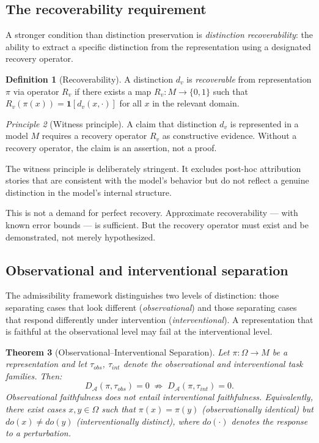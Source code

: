 \documentclass[11pt, a4paper]{article}
\theoremstyle{plain}
\newtheorem{theorem}{Theorem}[section]
\theoremstyle{definition}
\newtheorem{definition}[theorem]{Definition}
\theoremstyle{remark}
\newtheorem{principle}[theorem]{Principle}
\newcommand{\Proj}{\pi}
\newcommand{\dA}{D_{\!\mathcal{A}}}
\begin{document}
\subsection{The recoverability requirement}

A stronger condition than distinction preservation is
\emph{distinction recoverability}: the ability to extract
a specific distinction from the representation using a
designated recovery operator.

\begin{definition}[Recoverability]
\label{def:recover}
A distinction $d_v$ is \emph{recoverable} from representation $\Proj$
via operator $R_v$ if there exists a map $R_v : M \to \{0,1\}$ such that
$R_v(\Proj(x)) = \mathbf{1}[d_v(x,\cdot)]$ for all $x$ in the relevant domain.
\end{definition}

\begin{principle}[Witness principle]
\label{prin:witness}
A claim that distinction $d_v$ is represented in a model $M$
requires a recovery operator $R_v$ as constructive evidence.
Without a recovery operator, the claim is an assertion, not a proof.
\end{principle}

The witness principle is deliberately stringent. It excludes
post-hoc attribution stories that are consistent with the
model's behavior but do not reflect a genuine distinction
in the model's internal structure.

This is not a demand for perfect recovery. Approximate
recoverability --- with known error bounds --- is sufficient.
But the recovery operator must exist and be demonstrated,
not merely hypothesized.

\subsection{Observational and interventional separation}

The admissibility framework distinguishes two levels of distinction:
those separating cases that look different (\emph{observational})
and those separating cases that respond differently under intervention
(\emph{interventional}). A representation that is faithful at the
observational level may fail at the interventional level.

\begin{theorem}[Observational--Interventional Separation]
\label{thm:oisep}
Let $\Proj : \Omega \to M$ be a representation and let $\tau_{obs}$,
$\tau_{int}$ denote the observational and interventional task families.
Then:
\[
  \dA(\Proj, \tau_{obs}) = 0
  \;\not\Rightarrow\;
  \dA(\Proj, \tau_{int}) = 0.
\]
Observational faithfulness does not entail interventional faithfulness.
Equivalently, there exist cases $x, y \in \Omega$ such that
$\Proj(x) = \Proj(y)$ (observationally identical) but $do(x) \neq do(y)$
(interventionally distinct), where $do(\cdot)$ denotes the response
to a perturbation.
\end{theorem}
\end{document}
